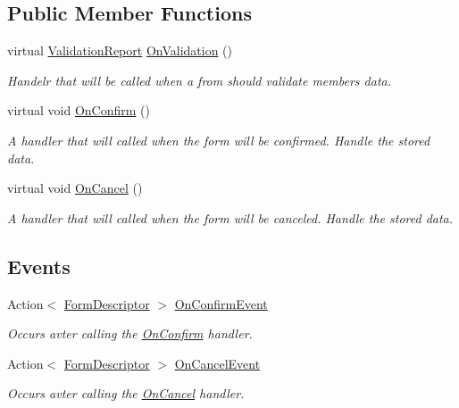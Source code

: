 \subsection*{Public Member Functions}
\begin{DoxyCompactItemize}
\item 
virtual \mbox{\hyperlink{struct_wpf_handler_1_1_u_i_1_1_auto_layout_1_1_form_descriptor_1_1_validation_report}{Validation\+Report}} \mbox{\hyperlink{class_wpf_handler_1_1_u_i_1_1_auto_layout_1_1_form_descriptor_a63527cbe3f75e544b7f4ab417bfbb555}{On\+Validation}} ()
\begin{DoxyCompactList}\small\item\em Handelr that will be called when a from should validate members data. \end{DoxyCompactList}\item 
virtual void \mbox{\hyperlink{class_wpf_handler_1_1_u_i_1_1_auto_layout_1_1_form_descriptor_ae2d4791e3085dba435c09b6082bd8408}{On\+Confirm}} ()
\begin{DoxyCompactList}\small\item\em A handler that will called when the form will be confirmed. Handle the stored data. \end{DoxyCompactList}\item 
virtual void \mbox{\hyperlink{class_wpf_handler_1_1_u_i_1_1_auto_layout_1_1_form_descriptor_a4bbe131238be232c253ca4c65e8493f4}{On\+Cancel}} ()
\begin{DoxyCompactList}\small\item\em A handler that will called when the form will be canceled. Handle the stored data. \end{DoxyCompactList}\end{DoxyCompactItemize}
\subsection*{Events}
\begin{DoxyCompactItemize}
\item 
Action$<$ \mbox{\hyperlink{class_wpf_handler_1_1_u_i_1_1_auto_layout_1_1_form_descriptor}{Form\+Descriptor}} $>$ \mbox{\hyperlink{class_wpf_handler_1_1_u_i_1_1_auto_layout_1_1_form_descriptor_a8a95b91b04aec2b3e109845866c25fb2}{On\+Confirm\+Event}}
\begin{DoxyCompactList}\small\item\em Occurs avter calling the \mbox{\hyperlink{class_wpf_handler_1_1_u_i_1_1_auto_layout_1_1_form_descriptor_ae2d4791e3085dba435c09b6082bd8408}{On\+Confirm}} handler. \end{DoxyCompactList}\item 
Action$<$ \mbox{\hyperlink{class_wpf_handler_1_1_u_i_1_1_auto_layout_1_1_form_descriptor}{Form\+Descriptor}} $>$ \mbox{\hyperlink{class_wpf_handler_1_1_u_i_1_1_auto_layout_1_1_form_descriptor_a5be99456050a10453139bf7a27baa78a}{On\+Cancel\+Event}}
\begin{DoxyCompactList}\small\item\em Occurs avter calling the \mbox{\hyperlink{class_wpf_handler_1_1_u_i_1_1_auto_layout_1_1_form_descriptor_a4bbe131238be232c253ca4c65e8493f4}{On\+Cancel}} handler. \end{DoxyCompactList}\end{DoxyCompactItemize}
